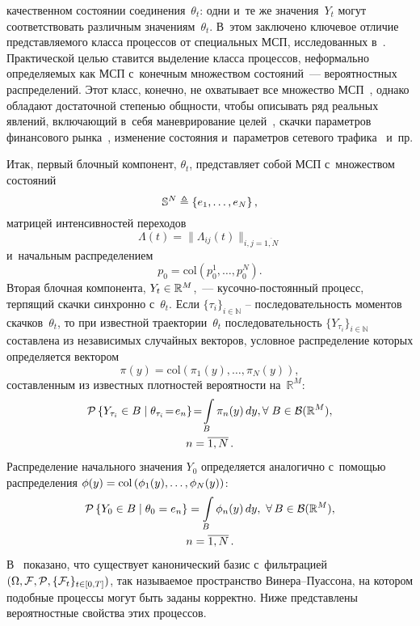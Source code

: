 \begin{multicols}{2}
качественном состоянии соединения~$\theta_t$: одни и~те же значения~$Y_t$ могут 
соответствовать различным значениям~$\theta_t$. В~этом заключено ключевое 
отличие представляемого класса процессов от специальных МСП, исследованных 
в~\cite{B_04_1}. Практической целью ставится выделение класса процессов, 
неформально определяемых как МСП с~конечным множеством состояний~--- 
вероятностных распределений. Этот класс, конечно, не охватывает все множество 
МСП~\cite{D_63, GS_73_2}, однако обладают достаточной степенью общности, чтобы 
описывать ряд реальных явлений, включающий в~себя маневрирование целей~\cite{LJ_05}, 
скачки параметров финансового рынка~\cite{mamon2014hidden}, 
изменение состояния и~параметров сетевого трафика~\cite{DPR_08} и~пр.

Итак, первый блочный компонент, $\theta_t$, пред\-став\-ля\-ет собой МСП с~множеством 
состояний 
$$
\mathbb{S}^N \triangleq  \left\{e_1, \ldots, e_N\right\},
$$
 матрицей 
интенсивностей переходов 
$$
\Lambda(t)=\|\Lambda_{ij}(t)\|_{i,j=\overline{1,N}}
$$ 
и~начальным распределением 
$$
p_0=\mathrm{col}\left(p_0^1,\ldots,p_0^N\right).
$$
Вторая блочная компонента,  $Y_t \hm\in \mathbb{R}^M$,~--- ку\-соч\-но-по\-сто\-ян\-ный 
процесс, терпящий скачки синхронно с~$\theta_t$. Если $\{\tau_i\}_{i \in 
\mathbb{N}}$ -- последовательность моментов скачков~$\theta_t$, то при известной 
траектории~$\theta_t$ последовательность $\{Y_{\tau_i}\}_{i \in \mathbb{N}}$ 
составлена из независимых случайных векторов, условное распределение которых 
определяется вектором 
$$
\pi(y) = \mathrm{col}\left(\pi_1(y),\ldots,\pi_N(y)\right),
$$
 составленным из 
известных плотностей ве\-ро\-ят\-ности на~$\mathbb{R}^M$:
\begin{multline*}
\pp{Y_{\tau_i}\in B\;|\;\theta_{\tau_i}\! =\! e_n}\! =\! \int\limits_{B} \pi_n(y)\,dy, \forall
\;B \hm\in \mathcal{B}(\mathbb{R}^M),\\
  n=\overline{1,N}\,.
\end{multline*}
Распределение начального значения $Y_0$ определяется аналогично с~по\-мощью 
распределения $\phi(y) \hm= \mathrm{col}\,(\phi_1(y),\ldots,\phi_N(y))$:
\begin{multline*}
\pp{Y_{0} \in B\;|\;\theta_{0} = e_n} = \int\limits_{B} \phi_n(y)\,dy,\ 
\forall\,B \hm\in \mathcal{B}(\mathbb{R}^M),\\
  n=\overline{1,N}\,.
\end{multline*}
В~\cite{IK_06} показано, что существует канонический базис с~фильтрацией 
$(\Omega,{\mathcal F},{\mathcal P}, \{{\mathcal F}_t\}_{t \in [0,T]})$, так называемое пространство Ви\-не\-ра--Пуас\-со\-на, 
на котором подобные процессы могут быть заданы корректно. Ниже 
представлены вероятностные свойства этих процессов.


\end{multicols}

